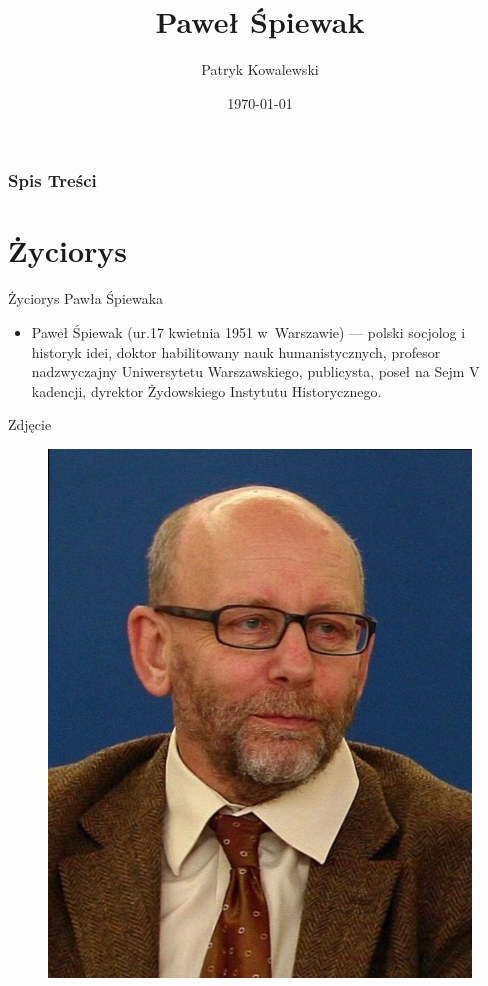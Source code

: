 \documentclass{beamer}
\title{Paweł Śpiewak}
\author{Patryk Kowalewski}
\institute{UWM}
\date{\today}
\begin{document}
\frame{\titlepage}

\begin{frame}
\frametitle{Spis Treści}
\tableofcontents
\end{frame}

\section{Życiorys}
\begin{frame}{Życiorys Pawła Śpiewaka}
\begin {itemize}
\item Paweł Śpiewak (ur.17 kwietnia 1951 w~Warszawie) --- polski socjolog i historyk idei, doktor habilitowany nauk humanistycznych, profesor nadzwyczajny Uniwersytetu Warszawskiego, publicysta, poseł na Sejm V kadencji, dyrektor Żydowskiego Instytutu Historycznego.
\end {itemize}
\end{frame}

\begin{frame}{Zdjęcie}

\begin{figure}[here]
\begin{center}
\includegraphics[scale=0.6]{pawcio.jpg}
\end{center}
\end{figure}

\end{frame}
\end{document}
